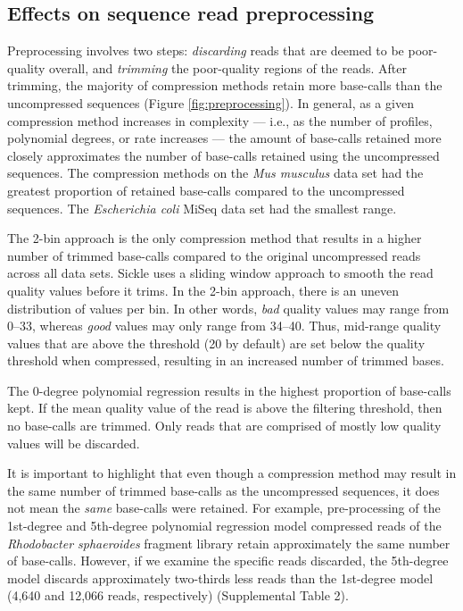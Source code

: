 \documentclass{bioinfo}
\begin{document}
\subsection{Effects on sequence read preprocessing}

Preprocessing involves two steps: \emph{discarding} reads that are
deemed to be poor-quality overall, and \emph{trimming} the
poor-quality regions of the reads. After trimming, the majority of
compression methods retain more base-calls than the uncompressed
sequences (Figure \ref{fig:preprocessing}). In general, as a given
compression method increases in complexity --- i.e., as the number of
profiles, polynomial degrees, or rate increases --- the amount of
base-calls retained more closely approximates the number of base-calls
retained using the uncompressed sequences. The compression methods on
the \textit{Mus musculus} data set had the greatest proportion of
retained base-calls compared to the uncompressed sequences. The
\textit{Escherichia coli} MiSeq data set had the smallest range.

The 2-bin approach is the only compression method that results in a
higher number of trimmed base-calls compared to the original
uncompressed reads across all data sets. Sickle uses a sliding window
approach to smooth the read quality values before it trims. In the
2-bin approach, there is an uneven distribution of values per bin. In
other words, \emph{bad} quality values may range from 0--33, whereas
\emph{good} values may only range from 34--40. Thus, mid-range quality
values that are above the threshold (20 by default) are set below the
quality threshold when compressed, resulting in an increased number of
trimmed bases.

The 0-degree polynomial regression results in the highest proportion
of base-calls kept. If the mean quality value of the read is above the
filtering threshold, then no base-calls are trimmed. Only reads that
are comprised of mostly low quality values will be discarded.

It is important to highlight that even though a compression method may
result in the same number of trimmed base-calls as the uncompressed
sequences, it does not mean the \emph{same} base-calls were retained.
For example, pre-processing of the 1st-degree and 5th-degree
polynomial regression model compressed reads of the
\textit{Rhodobacter sphaeroides} fragment library retain approximately
the same number of base-calls. However, if we examine the specific
reads discarded, the 5th-degree model discards approximately
two-thirds less reads than the 1st-degree model (4,640 and 12,066
reads, respectively) (Supplemental Table 2).
\end{document}
